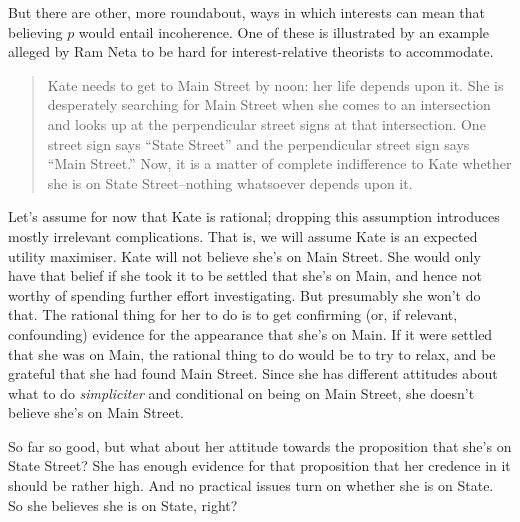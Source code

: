 But there are other, more roundabout, ways in which interests can mean that believing $p$ would entail incoherence. One of these is illustrated by an example alleged by Ram Neta to be hard for interest-relative theorists to accommodate.

\begin{quote}
Kate needs to get to Main Street by noon: her life depends upon it. She is desperately searching for Main Street when she comes to an intersection and looks up at the perpendicular street signs at that intersection. One street sign says ``State Street'' and the perpendicular street sign says ``Main Street.'' Now, it is a matter of complete indifference to Kate whether she is on State Street--nothing whatsoever depends upon it. \citep[182]{Neta2007}
\end{quote}

\noindent Let's assume for now that Kate is rational; dropping this assumption introduces mostly irrelevant complications. That is, we will assume Kate is an expected utility maximiser. Kate will not believe she's on Main Street. She would only have that belief if she took it to be settled that she's on Main, and hence not worthy of spending further effort investigating. But presumably she won't do that. The rational thing for her to do is to get confirming (or, if relevant, confounding) evidence for the appearance that she's on Main. If it were settled that she was on Main, the rational thing to do would be to try to relax, and be grateful that she had found Main Street. Since she has different attitudes about what to do \textit{simpliciter} and conditional on being on Main Street, she doesn't believe she's on Main Street.

So far so good, but what about her attitude towards the proposition that she's on State Street? She has enough evidence for that proposition that her credence in it should be rather high. And no practical issues turn on whether she is on State. So she believes she is on State, right?

